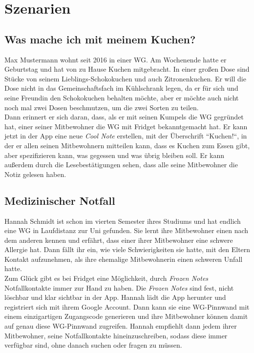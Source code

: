 \documentclass[a4paper]{scrreprt}
\begin{document}
    
    	\clearpage
    		
        \section{Szenarien}
        
        
        \subsection{Was mache ich mit meinem Kuchen?}
        Max Mustermann wohnt seit 2016 in einer WG. Am Wochenende hatte er Geburtstag und hat von zu Hause Kuchen mitgebracht. In einer großen Dose sind Stücke von seinem Lieblings-Schokokuchen und auch Zitronenkuchen. Er will die Dose nicht in das Gemeinschaftsfach im Kühlschrank legen, da er für sich und seine Freundin den Schokokuchen behalten möchte, aber er möchte auch nicht noch mal zwei Dosen beschmutzen, um die zwei Sorten zu teilen.\\
        Dann erinnert er sich daran, dass, als er mit seinen Kumpels die WG gegründet hat, einer seiner Mitbewohner die WG mit Fridget bekanntgemacht hat. Er kann jetzt in der App eine neue \textit{Cool Note} erstellen, mit der Überschrift ``Kuchen!“, in der er allen seinen Mitbewohnern mitteilen kann, dass es Kuchen zum Essen gibt, aber spezifizieren kann, was gegessen und was übrig bleiben soll. Er kann außerdem durch die Lesebestätigungen sehen, dass alle seine Mitbewohner die Notiz gelesen haben.
        \\
        
        \subsection{Medizinischer Notfall}
        Hannah Schmidt ist schon im vierten Semester ihres Studiums und hat endlich eine WG in Laufdistanz zur Uni gefunden. Sie lernt ihre Mitbewohner einen nach dem anderen kennen und erfährt, dass einer ihrer Mitbewohner eine schwere Allergie hat. Dann fällt ihr ein, wie viele Schwierigkeiten sie hatte, mit den Eltern Kontakt aufzunehmen, als ihre ehemalige Mitbewohnerin einen schweren Unfall hatte.\\
        Zum Glück gibt es bei Fridget eine Möglichkeit, durch \textit{Frozen Notes} Notfallkontakte immer zur Hand zu haben. Die \textit{Frozen Notes} sind fest, nicht löschbar und klar sichtbar in der App. Hannah lädt die App herunter und registriert sich mit ihrem Google Account. Dann kann sie eine WG-Pinnwand mit einem einzigartigen Zugangscode generieren und ihre Mitbewohner können damit auf genau diese WG-Pinnwand zugreifen. Hannah empfiehlt dann jedem ihrer Mitbewohner, seine Notfallkontakte hineinzuschreiben, sodass diese immer verfügbar sind, ohne danach suchen oder fragen zu müssen.
        \newpage
        
\end{document}
